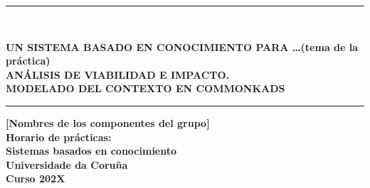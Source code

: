 \documentclass[12pt,a4paper,twoside,spanish]{article}      %
\begin{document}
\def\chaptername{Capítulo}
\def\tablename{Tabla}
\def\listtablename{Índice de Tablas}
\chapterfont{\LARGE\raggedleft}

\pagestyle{empty}

\begin{titlepage}
\setlength{\parindent}{0cm} \setlength{\parskip}{0cm}


\newcommand{\HRule}{\rule{\linewidth}{1mm}}

\vspace*{2cm}
\HRule \\[0.5cm]
\begin{center}
\textsf{\textbf{\large UN SISTEMA BASADO EN CONOCIMIENTO PARA \ldots(tema de la práctica)\\[0.75cm]
ANÁLISIS DE VIABILIDAD E IMPACTO. \\[0.25cm] MODELADO DEL CONTEXTO EN COMMONKADS \\[0.5cm]}}
\HRule \vspace*{3cm}

\textsf{\textbf{\normalsize [Nombres de los componentes del
grupo]\\[5cm]
Horario de prácticas:\\[2.5cm]
Sistemas basados en conocimiento\\
Universidade da Coruña \\ Curso
202X}}
\end{center}
\end{titlepage}

\cleardoublepage


\tableofcontents
\cleardoublepage



 \pagestyle{myheadings} 
\end{document}
